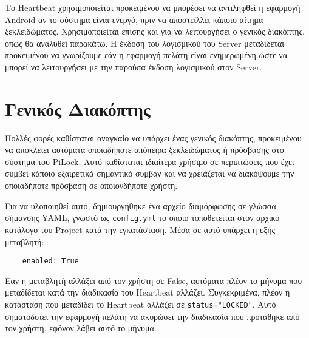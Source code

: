 	Το Heartbeat χρησιμοποιείται προκειμένου να μπορέσει να αντιληφθεί η εφαρμογή Android αν το σύστημα είναι ενεργό, πριν να αποστείλλει κάποιο αίτημα ξεκλειδώματος. Χρησιμοποιείται επίσης και για να λειτουργήσει ο γενικός διακόπτης, όπως θα αναλυθεί παρακάτω. Η έκδοση του λογισμικού του Server μεταδίδεται προκειμένου να γνωρίζουμε εάν η εφαρμογή πελάτη είναι ενημερωμένη ώστε να μπορεί να λειτουργήσει με την παρούσα έκδοση λογισμικού στον Server. 

\section{Γενικός Διακόπτης}
	Πολλές φορές καθίσταται αναγκαίο να υπάρχει ένας γενικός διακόπτης, προκειμένου να αποκλείει αυτόματα οποιαδήποτε απόπειρα ξεκλειδώματος ή πρόσβασης στο σύστημα του PiLock. Αυτό καθίσταται ιδιαίτερα χρήσιμο σε περιπτώσεις που έχει συμβεί κάποιο εξαιρετικά σημαντικό συμβάν και να χρειάζεται να διακόψουμε την οποιαδήποτε πρόσβαση σε οποιονδήποτε χρήστη. 

	Για να υλοποιηθεί αυτό, δημιουργήθηκε ένα αρχείο διαμόρφωσης σε γλώσσα σήμανσης YAML, γνωστό ως \verb|config.yml| το οποίο τοποθετείται στον αρχικό κατάλογο του Project κατά την εγκατάσταση. Μέσα σε αυτό υπάρχει η εξής μεταβλητή:

	\begin{lstlisting}
	enabled: True\end{lstlisting}

	Εαν η μεταβλητή αλλάξει από τον χρήστη σε False, αυτόματα πλέον το μήνυμα που μεταδίδεται κατά την διαδικασία του Heartbeat αλλάζει. Συγκεκριμένα, πλέον η κατάσταση που μεταδίδει το Heartbeat αλλάζει σε \verb|status="LOCKED"|. Αυτό σηματοδοτεί την εφαρμογή πελάτη να ακυρώσει την διαδικασία που προτάθηκε από τον χρήστη, εφόνον λάβει αυτό το μήνυμα.